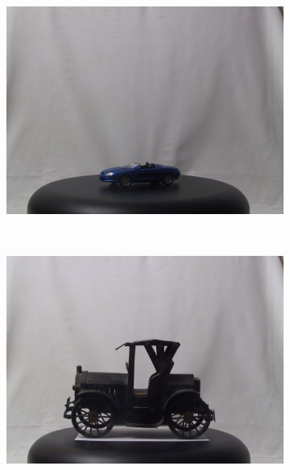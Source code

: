 \documentclass[review]{elsarticle}
\begin{document}
\begin{figure}[htb]
\begin{subfigure}[t]{0.15\columnwidth}
        \includegraphics[width=1\columnwidth]{images/3d/3}
    \end{subfigure}%
    ~ %
    \begin{subfigure}[t]{0.15\columnwidth}
        \centering
        \includegraphics[width=1\columnwidth]{images/3d/4}
    \end{subfigure}%
    ~ %
    \begin{subfigure}[t]{0.15\columnwidth}
        \centering

\end{subfigure}
\end{figure}
\end{document}
